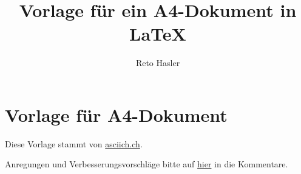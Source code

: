 \documentclass[a4paper]{scrartcl}
\title{Vorlage für ein A4-Dokument in \LaTeX}
\author{Reto Hasler}
\begin{document}
\maketitle
\thispagestyle{empty}

\tableofcontents

\section{Vorlage für A4-Dokument}

Diese Vorlage stammt von \href{https//asciich.ch}{asciich.ch}.

Anregungen und Verbesserungsvorschläge bitte auf
\href{https://asciich.ch/wordpress/software/latex/a4-dokumentenvorlage-in-latex/}{hier}
in die Kommentare.

\end{document}
